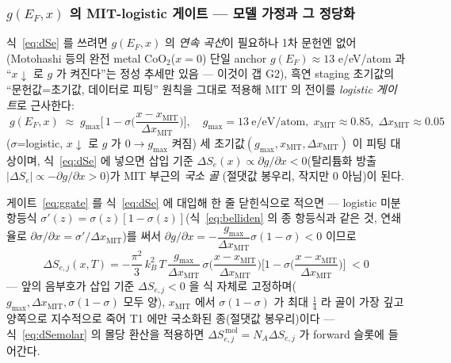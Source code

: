 \documentclass[11pt,a4paper]{article}
\begin{document}
\subsubsection{$g(E_F,x)$ 의 MIT-logistic 게이트 — 모델 가정과 그 정당화}\label{sec:lco-gate}
식~\eqref{eq:dSe} 를 쓰려면 $g(E_F,x)$ 의 \emph{연속 곡선}이 필요하나 1차 문헌엔 없어(Motohashi
등\cite{motohashi2009}의 완전 metal $\mathrm{CoO_2}$($x{=}0$) 단일 anchor $g(E_F)\!\approx\!13$ e/eV/atom 과
``$x\!\downarrow$ 로 $g$ 가 켜진다''는 정성 추세만 있음 — 이것이 갭 G2), 흑연 staging 초기값의
``문헌값=초기값, 데이터로 피팅'' 원칙을 그대로 적용해 MIT 의 전이를 \emph{logistic 게이트}로 근사한다:
\begin{equation}
\boxed{\;g(E_F,x)\;\approx\;g_{\max}\Big[\,1-\sigma\!\Big(\frac{x-x_\mathrm{MIT}}{\Delta x_\mathrm{MIT}}\Big)\Big],
\quad g_{\max}=13\ \text{e/eV/atom},\;x_\mathrm{MIT}\approx0.85,\;\Delta x_\mathrm{MIT}\approx0.05\;}
\label{eq:ggate}
\end{equation}
($\sigma$=logistic, $x\!\downarrow$ 로 $g$ 가 $0\!\to\!g_{\max}$ 켜짐) 세 초기값$(g_{\max},x_\mathrm{MIT},
\Delta x_\mathrm{MIT})$ 이 피팅 대상이며, 식~\eqref{eq:dSe} 에 넣으면 삽입 기준 $\Delta S_e(x)\propto\partial g
/\partial x<0$(탈리튬화 방출 $|\Delta S_e|\propto-\partial g/\partial x>0$)가 MIT 부근의 \emph{국소 골}
(절댓값 봉우리, 작지만 0 아님)이 된다.

게이트~\eqref{eq:ggate} 를 식~\eqref{eq:dSe} 에 대입해 한 줄 닫힌식으로 적으면 — logistic 미분 항등식
$\sigma'(z)=\sigma(z)[1-\sigma(z)]$(식~\eqref{eq:belliden} 의 종 항등식과 같은 것, 연쇄율로
$\partial\sigma/\partial x=\sigma'/\Delta x_\mathrm{MIT}$)를 써서 $\partial g/\partial x=-\dfrac{g_{\max}}{\Delta x_\mathrm{MIT}}
\sigma(1-\sigma)<0$ 이므로
\begin{equation}
\boxed{\;\Delta S_{e,j}(x,T)
=-\frac{\pi^2}{3}\,k_B^2\,T\,\frac{g_{\max}}{\Delta x_\mathrm{MIT}}\,
\sigma\!\Big(\frac{x-x_\mathrm{MIT}}{\Delta x_\mathrm{MIT}}\Big)
\Big[1-\sigma\!\Big(\frac{x-x_\mathrm{MIT}}{\Delta x_\mathrm{MIT}}\Big)\Big]\;<0\;}
\label{eq:dSegate}
\end{equation}
— 앞의 음부호가 삽입 기준 $\Delta S_{e,j}<0$ 을 식 자체로 고정하며($g_{\max},\Delta x_\mathrm{MIT},
\sigma(1-\sigma)$ 모두 양), $x_\mathrm{MIT}$ 에서 $\sigma(1-\sigma)$ 가 최대 $\tfrac14$ 라 골이 가장 깊고 양쪽으로
지수적으로 죽어 T1 에만 국소화된 종(절댓값 봉우리)이다 — 식~\eqref{eq:dSemolar} 의 몰당 환산을 적용하면
$\Delta S_{e,j}^{\,\mathrm{mol}}=N_A\Delta S_{e,j}$ 가 forward 슬롯에 들어간다.
\end{document}
